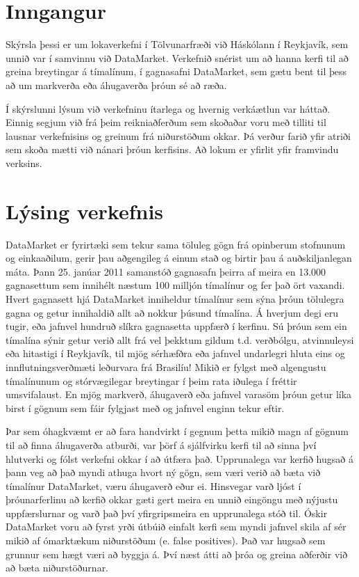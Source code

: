 \documentclass{article}
\begin{document}
\raggedright

\tableofcontents
\newpage

\section{Inngangur}
Skýrsla þessi er um lokaverkefni í Tölvunarfræði við Háskólann í
Reykjavík, 
sem unnið var í samvinnu við DataMarket. Verkefnið snérist um að hanna kerfi til að greina
breytingar á tímalínum, í gagnasafni DataMarket, sem gætu bent til þess að um markverða eða áhugaverða þróun sé að ræða.

Í skýrslunni lýsum við verkefninu ítarlega og hvernig verkáætlun var háttað.
Einnig segjum við frá þeim reikniaðferðum sem skoðaðar voru með tilliti til 	
lausnar verkefnisins og greinum frá niðurstöðum okkar. Þá 
verður farið yfir atriði sem skoða mætti við nánari þróun kerfisins.
Að lokum er yfirlit yfir framvindu verksins.

\newpage
\section{Lýsing verkefnis}
\label{sec:description}
DataMarket er fyrirtæki sem tekur sama töluleg gögn frá opinberum
stofnunum og einkaaðilum, gerir þau aðgengileg á einum stað og birtir þau á
auðskiljanlegan máta. Þann 25. janúar 2011 samanstóð gagnasafn þeirra 
af meira en 13.000 gagnasettum sem innihélt næstum 100 milljón tímalínur og 
fer það ört vaxandi. Hvert gagnasett hjá DataMarket inniheldur tímalínur sem sýna þróun tölulegra
gagna og getur innihaldið allt að nokkur þúsund tímalína. 
Á hverjum degi eru tugir, eða jafnvel hundruð slíkra gagnasetta uppfærð í
kerfinu. Sú þróun sem ein tímalína sýnir getur verið allt frá vel þekktum gildum t.d. verðbólgu, atvinnuleysi eða
hitastigi í Reykjavík, til mjög sérhæfðra eða jafnvel undarlegri hluta eins og 
innflutningsverðmæti leðurvara frá Brasilíu! 
Mikið er fylgst með algengustu tímalínunum og stórvægilegar breytingar 
í þeim rata iðulega í fréttir umsvifalaust. 
En mjög markverð, áhugaverð eða jafnvel varasöm þróun getur líka birst 
í gögnum sem fáir fylgjast með og jafnvel enginn tekur eftir. 

Þar sem óhagkvæmt er að fara handvirkt í gegnum þetta mikið magn af gögnum 
til að finna áhugaverða atburði, var þörf á sjálfvirku kerfi til að 
sinna því hlutverki og fólst verkefni okkar í að útfæra það.
Upprunalega var kerfið hugsað á þann veg að það myndi athuga hvort ný gögn, sem
væri verið að bæta við tímalínur DataMarket, væru áhugaverð eður ei. Hinsvegar
varð ljóst í þróunarferlinu að kerfið okkar gæti gert meira en unnið
eingöngu með nýjustu uppfærslurnar og varð það því yfirgripsmeira en
upprunalega stóð til.
Óskir DataMarket voru að fyrst yrði útbúið einfalt kerfi sem myndi jafnvel 
skila af sér mikið af ómarktækum niðurstöðum (e. false positives). Það var hugsað
sem grunnur sem hægt væri að byggja á. Því næst átti að þróa og greina aðferðir við
að bæta niðurstöðurnar. 
\end{document}
